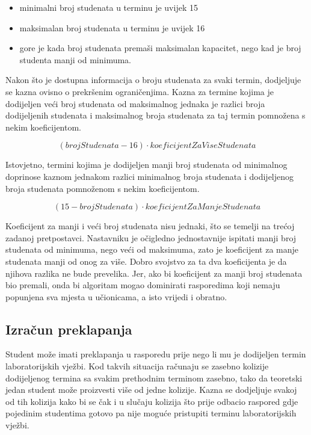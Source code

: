 \documentclass[times, utf8, zavrsni]{fer}
\begin{document}
\begin{itemize}
	\item minimalni broj studenata u terminu je uvijek 15
	\item maksimalan broj studenata u terminu je uvijek 16
	\item gore je kada broj studenata premaši maksimalan kapacitet, nego kad je broj studenta manji od minimuma.
\end{itemize}

Nakon što je dostupna informacija o broju studenata za svaki termin, dodjeljuje se kazna ovisno o prekršenim ograničenjima. Kazna za termine kojima je dodijeljen veći broj studenata od maksimalnog jednaka je razlici broja dodijeljenih studenata i maksimalnog broja studenata za taj termin pomnožena s nekim koeficijentom.

\begin{equation}
(brojStudenata - 16) \cdot koeficijentZaViseStudenata
\label{eq:max-studenta}
\end{equation}

Istovjetno, termini kojima je dodijeljen manji broj studenata od minimalnog doprinose kaznom jednakom razlici minimalnog broja studenata i dodijeljenog broja studenata pomnoženom s nekim koeficijentom.

\begin{equation}
(15 - brojStudenata) \cdot koeficijentZaManjeStudenata
\label{eq:min-studenta}
\end{equation}

Koeficijent za manji i veći broj studenata nisu jednaki, što se temelji na trećoj zadanoj pretpostavci. Nastavniku je očigledno jednostavnije ispitati manji broj studenata od minimuma, nego veći od maksimuma, zato je koeficijent za manje studenata manji od onog za više. Dobro svojstvo za ta dva koeficijenta je da njihova razlika ne bude prevelika. Jer, ako bi koeficijent za manji broj studenata bio premali, onda bi algoritam mogao dominirati rasporedima koji nemaju popunjena sva mjesta u učionicama, a isto vrijedi i obratno.

\subsection{Izračun preklapanja}

Student može imati preklapanja u rasporedu prije nego li mu je dodijeljen termin laboratorijskih vježbi. Kod takvih situacija računaju se zasebno kolizije dodijeljenog termina sa svakim prethodnim terminom zasebno, tako da teoretski jedan student može proizvesti više od jedne kolizije. Kazna se dodjeljuje svakoj od tih kolizija kako bi se čak i u slučaju kolizija što prije odbacio raspored gdje pojedinim studentima gotovo pa nije moguće pristupiti terminu laboratorijskih vježbi.
\end{document}
